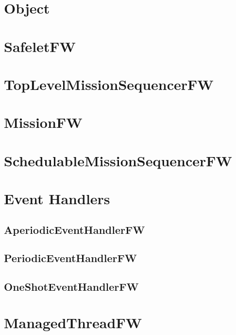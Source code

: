 \documentclass{article}
\begin{document}
\section{Object}


\section{SafeletFW}

\newpage

\section{TopLevelMissionSequencerFW}

\newpage

\section{MissionFW}

\newpage

\section{SchedulableMissionSequencerFW}

\newpage

\section{Event Handlers}
\subsection{AperiodicEventHandlerFW}

\newpage

\subsection{PeriodicEventHandlerFW}

\newpage

\subsection{OneShotEventHandlerFW}

\newpage

\section{ManagedThreadFW}

\newpage
\end{document}

